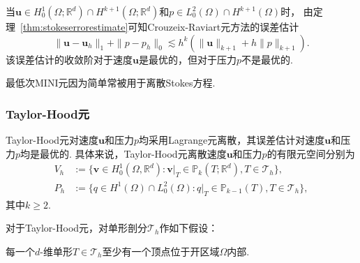 当$\boldsymbol{u}\in H_0^1(\Omega;\mathbb R^d)\cap H^{k+1}(\Omega;\mathbb R^d)$和$p\in L_0^2(\Omega)\cap H^{k+1}(\Omega)$时， 由定理~\ref{thm:stokeserrorestimate}可知Crouzeix-Raviart元方法的误差估计
\begin{equation*}
\|\boldsymbol{u}-\boldsymbol{u}_h\|_{1} + \|p-p_h\|_{0}
\lesssim h^k(\|\boldsymbol{u}\|_{k+1}+h\|p\|_{k+1}).
\end{equation*}
该误差估计的收敛阶对于速度$\boldsymbol{u}$是最优的，但对于压力$p$不是最优的.

最低次MINI元因为简单常被用于离散Stokes方程.



\subsubsection{Taylor-Hood元}

Taylor-Hood元\cite{TaylorHood1973,Boffi1994,Boffi1997}对速度$\boldsymbol{u}$和压力$p$均采用Lagrange元离散，其误差估计对速度$\boldsymbol{u}$和压力$p$均是最优的. 具体来说，Taylor-Hood元离散速度$\boldsymbol{u}$和压力$p$的有限元空间分别为
\begin{align*}
V_{h}&:=\{\boldsymbol{v}\in H_{0}^{1}(\Omega,\mathbb{R}^{d}): \boldsymbol{v}|_T\in \mathbb P_k(T;\mathbb{R}^{d}), T\in \mathcal{T}_h\},
\\
P_{h}&:=\{q\in H^{1}(\Omega)\cap L_{0}^2(\Omega): q|_T\in \mathbb P_{k-1}(T), T\in \mathcal{T}_h\},
\end{align*}
其中$k\geq2$.

对于Taylor-Hood元，对单形剖分$\mathcal T_h$作如下假设：

\begin{center}
每一个$d$-维单形$T\in\mathcal T_h$至少有一个顶点位于开区域$\Omega$内部. 
\end{center}

